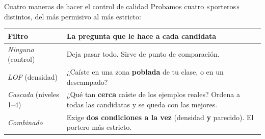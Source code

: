 \begin{frame}{Cuatro maneras de hacer el control de calidad}
\small
Probamos cuatro «porteros» distintos, del más permisivo al más estricto:

\vspace{0.5em}
\begin{tabular}{@{}p{2.9cm}p{9.2cm}@{}}
\toprule
\textbf{Filtro} & \textbf{La pregunta que le hace a cada candidata} \\
\midrule
\textit{Ninguno} (control)  & Deja pasar todo. Sirve de punto de comparación. \\[4pt]
\textit{LOF} (densidad)     & ¿Caíste en una zona \textbf{poblada} de tu clase, o en un descampado? \\[4pt]
\textit{Cascada} (niveles 1--4) & ¿Qué tan \textbf{cerca} caíste de los ejemplos reales? Ordena a todas las candidatas y se queda con las mejores. \\[4pt]
\textit{Combinado}          & Exige \textbf{dos condiciones a la vez} (densidad \textbf{y} parecido). El portero más estricto. \\
\bottomrule
\end{tabular}

\end{frame}

